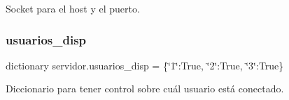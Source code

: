 Socket para el host y el puerto. 

\mbox{\label{namespaceservidor_a426dd886ca17c5f85d5638637ffdf558}} 
\subsubsection{\texorpdfstring{usuarios\+\_\+disp}{usuarios\_disp}}
{\footnotesize\ttfamily dictionary servidor.\+usuarios\+\_\+disp = \{\char`\"{}1\char`\"{}\+:True, \char`\"{}2\char`\"{}\+:True, \char`\"{}3\char`\"{}\+:True\}}



Diccionario para tener control sobre cuál usuario está conectado. 

